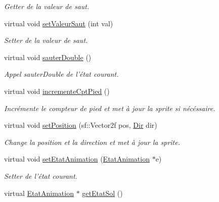 \begin{DoxyCompactItemize}
\begin{DoxyCompactList}\small\item\em Getter de la valeur de saut. \end{DoxyCompactList}\item 
virtual void \hyperlink{classDecorateurPersonnage_a0570f794908b1b1426bdc4b5ca2b1223}{set\-Valeur\-Saut} (int val)
\begin{DoxyCompactList}\small\item\em Setter de la valeur de saut. \end{DoxyCompactList}\item 
\hypertarget{classDecorateurPersonnage_af52fbc94ac821071ffe255e866dc77bd}{virtual void \hyperlink{classDecorateurPersonnage_af52fbc94ac821071ffe255e866dc77bd}{sauter\-Double} ()}\label{classDecorateurPersonnage_af52fbc94ac821071ffe255e866dc77bd}

\begin{DoxyCompactList}\small\item\em Appel sauter\-Double de l'état courant. \end{DoxyCompactList}\item 
\hypertarget{classDecorateurPersonnage_af1e5e40f4a670ee535ddf3f6c9357100}{virtual void \hyperlink{classDecorateurPersonnage_af1e5e40f4a670ee535ddf3f6c9357100}{incremente\-Cpt\-Pied} ()}\label{classDecorateurPersonnage_af1e5e40f4a670ee535ddf3f6c9357100}

\begin{DoxyCompactList}\small\item\em Incrémente le compteur de pied et met à jour la sprite si nécéssaire. \end{DoxyCompactList}\item 
virtual void \hyperlink{classDecorateurPersonnage_a85355d479f87bfd6907c39086eeb44c5}{set\-Position} (sf\-::\-Vector2f pos, \hyperlink{Espace_8h_a7cf6e8c5a5bc5e7b2afef3647870b1c4}{Dir} dir)
\begin{DoxyCompactList}\small\item\em Change la position et la direction et met à jour la sprite. \end{DoxyCompactList}\item 
virtual void \hyperlink{classDecorateurPersonnage_a2b3f76b026571b3d1434e3af711c65ec}{set\-Etat\-Animation} (\hyperlink{classEtatAnimation}{Etat\-Animation} $\ast$e)
\begin{DoxyCompactList}\small\item\em Setter de l'état courant. \end{DoxyCompactList}\item 
\hypertarget{classDecorateurPersonnage_a52d4a0694b6831bb96732d5a08af3829}{virtual \hyperlink{classEtatAnimation}{Etat\-Animation} $\ast$ \hyperlink{classDecorateurPersonnage_a52d4a0694b6831bb96732d5a08af3829}{get\-Etat\-Sol} ()}\label{classDecorateurPersonnage_a52d4a0694b6831bb96732d5a08af3829}


\end{DoxyCompactItemize}

